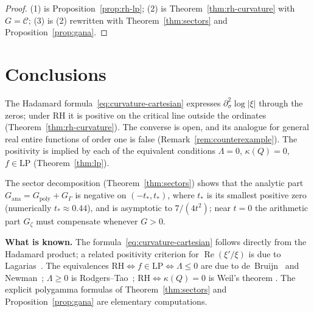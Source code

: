 \documentclass[11pt]{amsart}
\renewcommand{\Re}{\operatorname{Re}}
\newcommand{\LP}{\mathrm{LP}}
\begin{document}
\begin{proof}
(1) is Proposition~\ref{prop:rh-lp}; (2) is Theorem~\ref{thm:rh-curvature} with
$G=\mathcal C$; (3) is (2) rewritten with Theorem~\ref{thm:sectors} and
Proposition~\ref{prop:gana}.
\end{proof}

\section{Conclusions}
\label{sec:conclusions}

The Hadamard formula~\eqref{eq:curvature-cartesian} expresses
$\partial^2_{\sigma}\log|\xi|$ through the zeros; under RH it is positive on the critical line
outside the ordinates (Theorem~\ref{thm:rh-curvature}). The converse is open, and its analogue
for general real entire functions of order one is false
(Remark~\ref{rem:counterexample}). The positivity is implied by each of the equivalent
conditions $\Lambda=0$, $\kappa(Q)=0$, $f\in\LP$ (Theorem~\ref{thm:lp}).

The sector decomposition (Theorem~\ref{thm:sectors}) shows that the analytic part
$G_{\mathrm{ana}} = G_{\mathrm{poly}} + G_\Gamma$ is negative on $(-t_*,t_*)$, where $t_*$ is its smallest positive zero
(numerically $t_*\approx0.44$), and is asymptotic to $7/(4t^2)$; near $t=0$ the arithmetic
part $G_\zeta$ must compensate whenever $G>0$.

\medskip

\noindent\textbf{What is known.}
The formula~\eqref{eq:curvature-cartesian} follows directly from the Hadamard product; a
related positivity criterion for $\Re(\xi'/\xi)$ is due to Lagarias~\cite{Lagarias1999}.
The equivalences $\mathrm{RH}\iff f\in\LP\iff\Lambda\le0$ are due to
de~Bruijn~\cite{deBruijn1950} and Newman~\cite{Newman1976}; $\Lambda\ge0$ is
Rodgers--Tao~\cite{RodgersTao2020}; $\mathrm{RH}\iff\kappa(Q)=0$ is Weil's theorem
\cite[Thm.~2.2]{P25}. The explicit polygamma formulas of
Theorem~\ref{thm:sectors} and Proposition~\ref{prop:gana} are elementary computations.
\end{document}
